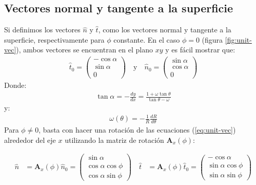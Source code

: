 \subsection{Vectores normal y tangente a la superficie}

Si definimos los vectores $\hat{n}$ y $\hat{t}$, como los vectores normal y tangente a la superficie, respectivamente para $\phi$ constante. En el caso $\phi = 0$ (figura \ref{fig:unit-vec}), ambos vectores se encuentran en el plano $xy$ y es fácil mostrar que:
\begin{align}
  \hat{t}_0 =
  \left(
  \begin{array}{c}
    -\cos\alpha \\
    \sin\alpha \\
    0
  \end{array}
  \right)
  \quad \mathrm{y} \quad
  \hat{n}_0 =
  \left(
  \begin{array}{c}
    \sin\alpha \\
    \cos\alpha \\
    0
  \end{array}
  \right)
  \label{eq:unit-vec}
\end{align}
Donde:
\begin{align}
  \tan\alpha = -\frac{dy}{dx} = \frac{1+\omega\tan\theta}{\tan\theta-\omega}
\end{align}
y:
\begin{align}
  \omega(\theta) = -\frac{1}{R}\frac{dR}{d\theta} 
\end{align}
Para $\phi \neq 0$, basta con hacer una rotación de las ecuaciones (\ref{eq:unit-vec}) alrededor del eje $x$ utilizando la matriz de rotación $\mathbf{A}_x(\phi)$:

\begin{align}
  \hat{n} &= \mathbf{A}_x(\phi)\hat{n}_0 =
 \left(
  \begin{array}{c}
    \sin\alpha \\
    \cos\alpha\cos\phi \\
    \cos\alpha\sin\phi
  \end{array}
  \right) \quad
    \hat{t} &= \mathbf{A}_x(\phi)\hat{t}_0 =
 \left(
  \begin{array}{c}
    -\cos\alpha \\
    \sin\alpha\cos\phi \\
    \sin\alpha\sin\phi
  \end{array}
  \right)
\end{align}


